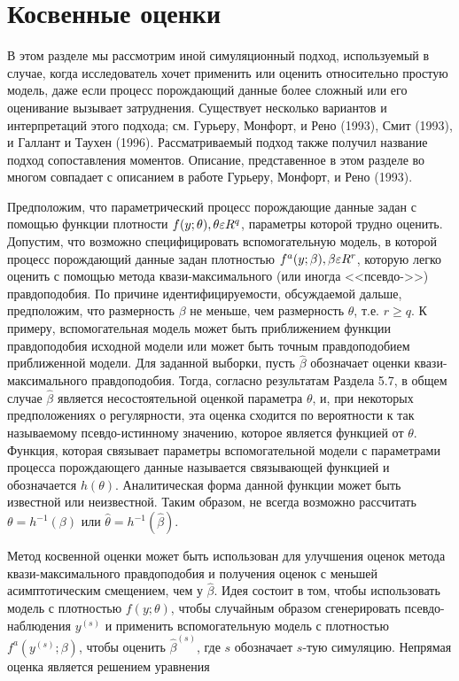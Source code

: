 \section{Косвенные оценки}

В этом разделе мы рассмотрим иной симуляционный подход, используемый в случае, когда исследователь хочет применить или оценить относительно простую модель, даже если процесс порождающий данные более сложный или его оценивание вызывает затруднения. Существует несколько вариантов и интерпретаций этого подхода; см. Гурьеру, Монфорт, и Рено (1993), Смит (1993), и Галлант и Таухен (1996). Рассматриваемый подход также получил название подход сопоставления моментов. Описание, представенное в этом разделе во многом совпадает с описанием в работе Гурьеру, Монфорт, и Рено (1993). 

Предположим, что параметрический процесс порождающие данные задан с помощью функции плотности $f(y;\theta),\theta{\varepsilon}R^{q}$, параметры которой трудно оценить. Допустим, что возможно специфицировать вспомогательную модель, в которой процесс порождающий данные задан плотностью $f^{a}(y;\beta), \beta{\varepsilon}R^{r}$, которую легко оценить с помощью метода квази-максимального (или иногда <<псевдо->>) правдоподобия. 
По причине идентифицируемости, обсуждаемой дальше, предположим, что размерность $\beta$ не меньше, чем размерность $\theta$, т.е. $r\geq q$. К примеру, вспомогательная модель может быть приближением функции правдоподобия исходной модели или может быть точным правдоподобием приближенной модели. 
Для заданной выборки, пусть $\hat{\beta}$ обозначает оценки квази-максимального правдоподобия. Тогда, согласно результатам Раздела 5.7, в общем случае $\hat{\beta}$ является несостоятельной оценкой параметра $\theta$, и, при некоторых предположениях о регулярности, эта оценка сходится по вероятности к так называемому псевдо-истинному значению, которое является функцией от $\theta$. 
Функция, которая связывает параметры вспомогательной модели с параметрами процесса порождающего данные называется связывающей функцией и обозначается $h(\theta)$. Аналитическая форма данной функции может быть известной или неизвестной. Таким образом, не всегда возможно рассчитать $\theta=h^{-1}(\beta)$ или $\hat{\theta}=h^{-1}(\hat{\beta})$.

Метод косвенной оценки может быть использован для улучшения оценок метода квази-максимального правдоподобия и получения оценок с меньшей асимптотическим смещением, чем у  $\hat{\beta}$. Идея состоит в том, чтобы использовать модель  с плотностью $f(y;\theta)$, чтобы случайным образом сгенерировать псевдо-наблюдения $y^{(s)}$ и применить вспомогательную модель с плотностью $f^{a}(y^{(s)};\beta)$, чтобы оценить $\hat{\beta}^{(s)}$, где $s$ обозначает $s$-тую симуляцию. Непрямая оценка является решением уравнения

